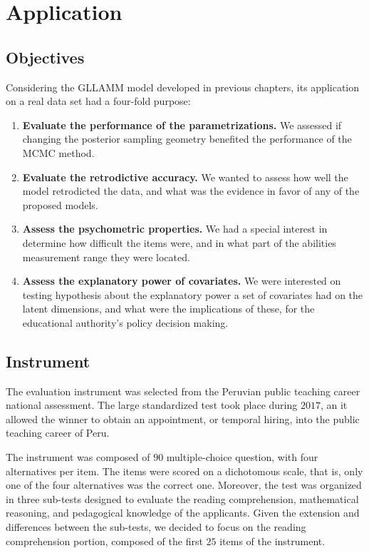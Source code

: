 \chapter{Application} \label{chap:application}

\section{Objectives}

Considering the GLLAMM model developed in previous chapters, its application on a real data set had a four-fold purpose:

\begin{enumerate}
	\item \textbf{Evaluate the performance of the parametrizations.} We assessed if changing the posterior sampling geometry benefited the performance of the MCMC method.
	\item \textbf{Evaluate the retrodictive accuracy.} We wanted to assess how well the model retrodicted the data, and what was the evidence in favor of any of the proposed models.
	\item \textbf{Assess the psychometric properties.} We had a special interest in determine how difficult the items were, and in what part of the abilities measurement range they were located.
	\item \textbf{Assess the explanatory power of covariates.} We were interested on testing hypothesis about the explanatory power a set of covariates had on the latent dimensions, and what were the implications of these, for the educational authority's policy decision making.
\end{enumerate}


\section{Instrument}

The evaluation instrument was selected from the Peruvian public teaching career national assessment. The large standardized test took place during $2017$, an it allowed the winner to obtain an appointment, or temporal hiring, into the public teaching career of Peru. 

The instrument was composed of $90$ multiple-choice question, with four alternatives per item. The items were scored on a dichotomous scale, that is, only one of the four alternatives was the correct one. Moreover, the test was organized in three sub-tests designed to evaluate the reading comprehension, mathematical reasoning, and pedagogical knowledge of the applicants. Given the extension and differences between the sub-tests, we decided to focus on the reading comprehension portion, composed of the first $25$ items of the instrument. 

